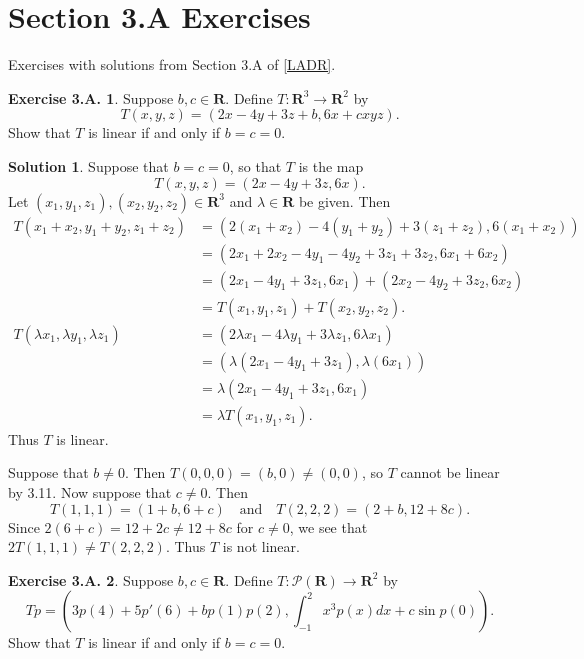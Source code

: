 \documentclass[12pt]{article}
\theoremstyle{definition}
\theoremstyle{exercise}
\newtheorem{exercise}{Exercise 3.A.}
\theoremstyle{solution}
\newtheorem*{solution}{Solution}
\newcommand{\poly}{\mathcal{P}}
\newcommand{\quand}{\quad \text{and} \quad}
\newcommand{\R}{\mathbf{R}}
\begin{document}
\section{Section 3.A Exercises}

Exercises with solutions from Section 3.A of \hyperlink{ladr}{[LADR]}.

\begin{exercise}
\label{ex:1}
    Suppose \( b, c \in \R \). Define \( T : \R^3 \to \R^2 \) by
    \[
        T(x, y, z) = (2x - 4y + 3z + b, 6x + cxyz).
    \]
    Show that \( T \) is linear if and only if \( b = c = 0 \).
\end{exercise}

\begin{solution}
    Suppose that \( b = c = 0 \), so that \( T \) is the map
    \[
        T(x, y, z) = (2x - 4y + 3z, 6x).
    \]
    Let \( (x_1, y_1, z_1), (x_2, y_2, z_2) \in \R^3 \) and \( \lambda \in \R \) be given. Then
    \begin{align*}
        T(x_1 + x_2, y_1 + y_2, z_1 + z_2) &= (2(x_1 + x_2) - 4(y_1 + y_2) + 3(z_1 + z_2), 6(x_1 + x_2)) \\
        &= (2 x_1 + 2 x_2 - 4 y_1 - 4 y_2 + 3 z_1 + 3 z_2, 6 x_1 + 6 x_2) \\
        &= (2 x_1 - 4 y_1 + 3 z_1, 6 x_1) + (2 x_2 - 4 y_2 + 3 z_2, 6 x_2) \\
        &= T(x_1, y_1, z_1) + T(x_2, y_2, z_2). \\[5mm]
        T(\lambda x_1, \lambda y_1, \lambda z_1) &= (2 \lambda x_1 - 4 \lambda y_1 + 3 \lambda z_1, 6 \lambda x_1) \\
        &= (\lambda (2 x_1 - 4 y_1 + 3 z_1), \lambda (6 x_1)) \\
        &= \lambda (2 x_1 - 4 y_1 + 3 z_1, 6 x_1) \\
        &= \lambda T(x_1, y_1, z_1).
    \end{align*}
    Thus \( T \) is linear.

    Suppose that \( b \neq 0 \). Then \( T(0, 0, 0) = (b, 0) \neq (0, 0) \), so \( T \) cannot be linear by 3.11. Now suppose that \( c \neq 0 \). Then
    \[
        T(1, 1, 1) = (1 + b, 6 + c) \quand T(2, 2, 2) = (2 + b, 12 + 8c).
    \]
    Since \( 2(6 + c) = 12 + 2c \neq 12 + 8c \) for \( c \neq 0 \), we see that \( 2 T(1, 1, 1) \neq T(2, 2, 2) \). Thus \( T \) is not linear.
\end{solution}

\begin{exercise}
\label{ex:2}
    Suppose \( b, c \in \R \). Define \( T : \poly(\R) \to \R^2 \) by
    \[
        T p = \left( 3 p(4) + 5 p'(6) + b p(1) p(2), \int_{-1}^2 x^3 p(x) dx + c \sin p(0) \right).
    \]
    Show that \( T \) is linear if and only if \( b = c = 0 \).
\end{exercise}
\end{document}
